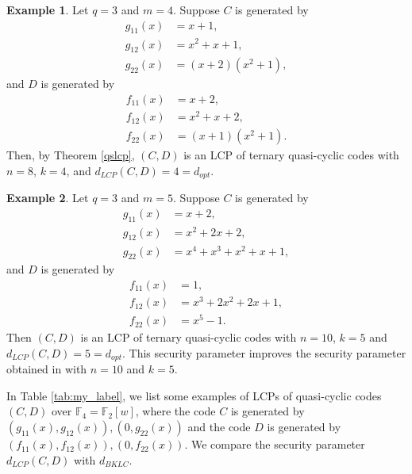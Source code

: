 \documentclass[12 pt]{extarticle}
\numberwithin{equation}{section}
\theoremstyle{definition}
\newtheorem{example}{Example}[section]
\begin{document}
\begin{example}
    Let $q=3$ and $m=4$. Suppose $C$ is generated by
 \begin{equation*}
     \begin{split}
       g_{11}(x)&=x+1,\\ 
       g_{12}(x)&=x^2+x+1,\\
        g_{22}(x)&=(x+2)(x^2+1),
     \end{split}
 \end{equation*}
  and $D$ is generated by 
  \begin{equation*}
     \begin{split}
       f_{11}(x)&=x+2,\\ 
       f_{12}(x)&=x^2+x+2,\\
     f_{22}(x)&=(x+1)(x^2+1).
     \end{split}
 \end{equation*}
 Then, by Theorem \ref{qslcp}, $(C,D)$ is an LCP of ternary quasi-cyclic codes with $n=8$, $k=4$, and $d_{LCP}(C,D)=4=d_{opt}$. 
\end{example}


\begin{example}
    Let $q=3$ and $m=5$. Suppose $C$ is generated by
 \begin{equation*}
     \begin{split}
       g_{11}(x)&=x+2,\\ 
       g_{12}(x)&=x^2+2x+2,\\
     g_{22}(x)&=x^4+x^3+x^2+x+1,
     \end{split}
 \end{equation*}
  and $D$ is generated by 
  \begin{equation*}
     \begin{split}
       f_{11}(x)&=1,\\ 
       f_{12}(x)&=x^3 + 2x^2 + 2x + 1,\\
       f_{22}(x)&=x^5-1.
     \end{split}
 \end{equation*}
 Then $(C,D)$ is an LCP of ternary quasi-cyclic codes with $n=10$, $k=5$ and $d_{LCP}(C,D)=5=d_{opt}$. This security parameter improves the security parameter obtained in  \cite[Table 3]{Aliabadi2023} with $n=10$ and $k=5$.
\end{example}
In Table \ref{tab:my_label}, we list some examples of LCPs of quasi-cyclic codes $(C,D)$ over $\mathbb{F}_4=\mathbb{F}_2[w]$, where the code $C$ is generated by $(g_{11}(x),g_{12}(x)), (0,g_{22}(x))$ and the code $D$ is generated by $(f_{11}(x),f_{12}(x)), (0,f_{22}(x))$. We compare the security parameter $d_{LCP}(C,D)$ with $d_{BKLC}$. 
\end{document}
